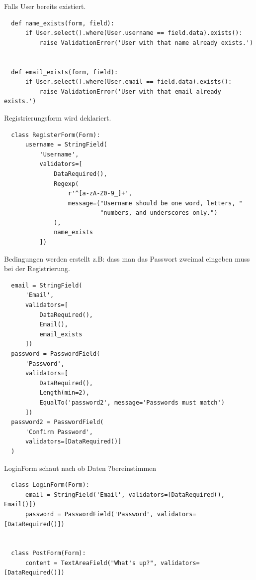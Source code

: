 \documentclass{article}
\begin{document}
Falls User bereits existiert.
\begin{lstlisting}
  def name_exists(form, field):
      if User.select().where(User.username == field.data).exists():
          raise ValidationError('User with that name already exists.')


  def email_exists(form, field):
      if User.select().where(User.email == field.data).exists():
          raise ValidationError('User with that email already exists.')
\end{lstlisting}





Registrierungsform wird deklariert.

\begin{lstlisting}
  class RegisterForm(Form):
      username = StringField(
          'Username',
          validators=[
              DataRequired(),
              Regexp(
                  r'^[a-zA-Z0-9_]+',
                  message=("Username should be one word, letters, "
                           "numbers, and underscores only.")
              ),
              name_exists
          ])
\end{lstlisting}






Bedingungen werden erstellt z.B: dass man das Passwort zweimal eingeben muss
bei der Registrierung.
\begin{lstlisting}
  email = StringField(
      'Email',
      validators=[
          DataRequired(),
          Email(),
          email_exists
      ])
  password = PasswordField(
      'Password',
      validators=[
          DataRequired(),
          Length(min=2),
          EqualTo('password2', message='Passwords must match')
      ])
  password2 = PasswordField(
      'Confirm Password',
      validators=[DataRequired()]
  )

\end{lstlisting}





LoginForm schaut nach ob Daten ?bereinstimmen
\begin{lstlisting}
  class LoginForm(Form):
      email = StringField('Email', validators=[DataRequired(), Email()])
      password = PasswordField('Password', validators=[DataRequired()])


  class PostForm(Form):
      content = TextAreaField("What's up?", validators=[DataRequired()])
\end{lstlisting}
\end{document}
